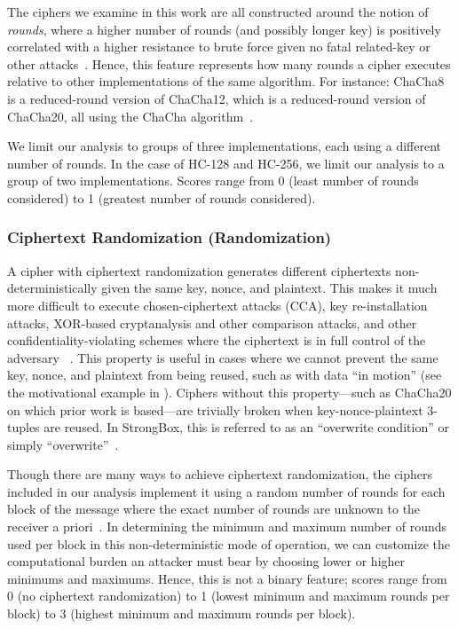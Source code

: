 The ciphers we examine in this work are all constructed around the notion of
\emph{rounds}, where a higher number of rounds (and possibly longer key) is
positively correlated with a higher resistance to brute force given no fatal
related-key or other attacks~\cite{ChaCha-Cryptanalysis}. Hence, this feature
represents how many rounds a cipher executes relative to other implementations
of the same algorithm. For instance: ChaCha8 is a reduced-round version of
ChaCha12, which is a reduced-round version of ChaCha20, all using the ChaCha
algorithm~\cite{ChaCha20,ChaCha-Cryptanalysis}.

We limit our analysis to groups of three implementations, each using a different
number of rounds. In the case of HC-128 and HC-256, we limit our analysis to a
group of two implementations. Scores range from 0 (least number of rounds
considered) to 1 (greatest number of rounds considered).

\subsubsection{Ciphertext Randomization (Randomization)}

A cipher with ciphertext randomization generates different ciphertexts
non-deterministically given the same key, nonce, and plaintext. This makes it
much more difficult to execute chosen-ciphertext attacks (CCA), key
re-installation attacks, XOR-based cryptanalysis and other comparison attacks,
and other confidentiality-violating schemes where the ciphertext is in full
control of the adversary ~\cite{Freestyle}. This property is useful in cases
where we cannot prevent the same key, nonce, and plaintext from being reused,
such as with data ``in motion'' (see the motivational example in
). Ciphers without this property---such as ChaCha20 on
which prior work is based---are trivially broken when key-nonce-plaintext
3-tuples are reused. In StrongBox, this is referred to as an ``overwrite
condition'' or simply ``overwrite''~\cite{StrongBox}.

Though there are many ways to achieve ciphertext randomization, the ciphers
included in our analysis implement it using a random number of rounds for each
block of the message where the exact number of rounds are unknown to the
receiver a priori~\cite{Freestyle}. In determining the minimum and maximum
number of rounds used per block in this non-deterministic mode of operation, we
can customize the computational burden an attacker must bear by choosing lower
or higher minimums and maximums. Hence, this is not a binary feature; scores
range from 0 (no ciphertext randomization) to 1 (lowest minimum and maximum
rounds per block) to 3 (highest minimum and maximum rounds per block).

